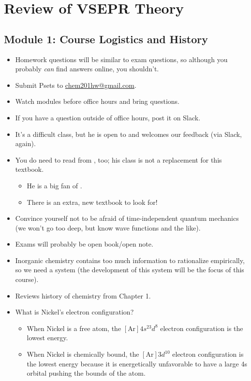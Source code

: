 \documentclass[../notes.tex]{subfiles}
\begin{document}
\chapter{Review of VSEPR Theory}
\section{Module 1: Course Logistics and History}
\begin{itemize}
    \item {}Homework questions will be similar to exam questions, so although you probably \emph{can} find answers online, you shouldn't.
    \item Submit Psets to \href{mailto:chem201hw@gmail.com}{chem201hw@gmail.com}.
    \item Watch modules before office hours and bring questions.
    \item If you have a question outside of office hours, post it on Slack.
    \item It's a difficult class, but he is open to and welcomes our feedback (via Slack, again).
    \item You do need to read from \textcite{bib:MiesslerFischerTarr}, too; his class is not a replacement for this textbook.
    \begin{itemize}
        \item He is a big fan of \textcite{bib:Cotton}.
        \item There is an extra, new textbook to look for!
    \end{itemize}
    \item Convince yourself not to be afraid of time-independent quantum mechanics (we won't go too deep, but know wave functions and the like).
    \item Exams will probably be open book/open note.
    \item Inorganic chemistry contains too much information to rationalize empirically, so we need a system (the development of this system will be the focus of this course).
    \item Reviews history of chemistry from \textcite{bib:MiesslerFischerTarr} Chapter 1.
    \item What is Nickel's electron configuration?
    \begin{itemize}
        \item When Nickel is a free atom, the $[\text{Ar}]4s^23d^8$ electron configuration is the lowest energy.
        \item When Nickel is chemically bound, the $[\text{Ar}]3d^{10}$ electron configuration is the lowest energy because it is energetically unfavorable to have a large 4s orbital pushing the bounds of the atom.

\end{itemize}
\end{itemize}
\end{document}
